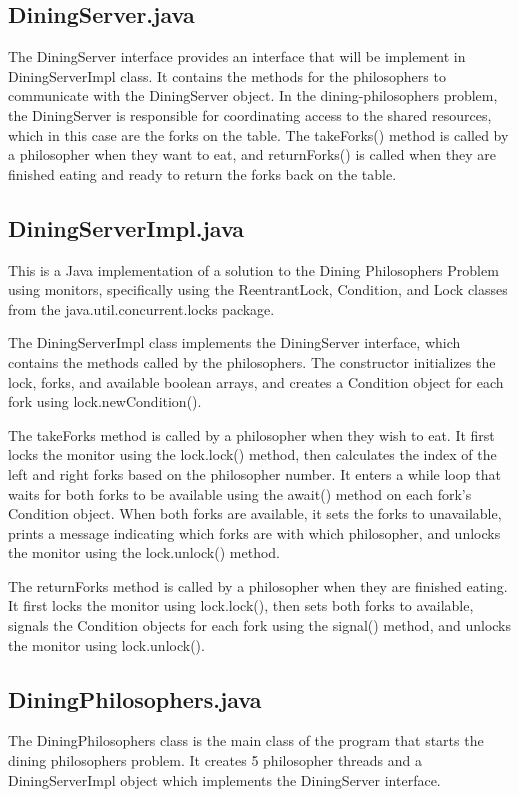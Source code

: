 \documentclass{article}
\begin{document}
\subsection{DiningServer.java}

The DiningServer interface provides an interface that will be implement in DiningServerImpl class. It contains the methods for the philosophers to communicate with the DiningServer object. In the dining-philosophers problem, the DiningServer is responsible for coordinating access to the shared resources, which in this case are the forks on the table. The takeForks() method is called by a philosopher when they want to eat, and returnForks() is called when they are finished eating and ready to return the forks back on the table.

\subsection{DiningServerImpl.java}

This is a Java implementation of a solution to the Dining Philosophers Problem using monitors, specifically using the ReentrantLock, Condition, and Lock classes from the java.util.concurrent.locks package.

The DiningServerImpl class implements the DiningServer interface, which contains the methods called by the philosophers. The constructor initializes the lock, forks, and available boolean arrays, and creates a Condition object for each fork using lock.newCondition().

The takeForks method is called by a philosopher when they wish to eat. It first locks the monitor using the lock.lock() method, then calculates the index of the left and right forks based on the philosopher number. It enters a while loop that waits for both forks to be available using the await() method on each fork's Condition object. When both forks are available, it sets the forks to unavailable, prints a message indicating which forks are with which philosopher, and unlocks the monitor using the lock.unlock() method.

The returnForks method is called by a philosopher when they are finished eating. It first locks the monitor using lock.lock(), then sets both forks to available, signals the Condition objects for each fork using the signal() method, and unlocks the monitor using lock.unlock().

\subsection{DiningPhilosophers.java}
The DiningPhilosophers class is the main class of the program that starts the dining philosophers problem. It creates 5 philosopher threads and a DiningServerImpl object which implements the DiningServer interface.
\end{document}
